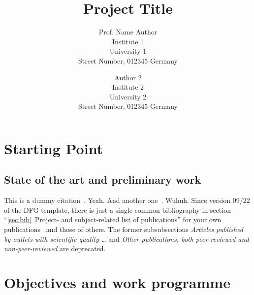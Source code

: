 \documentclass[american,firsttime]{dfgproposal}
\title{Project Title}
\author[%
	Prof. Name Author\\
	Institute 1, University 1 (Abbr)
	\and
	Author 2\\
	Institute 2, University 2 (Abbr2)
]{Prof. Name Author\\
	Institute 1\\University 1\\Street Number, 012345 Germany
	\and
	Author 2\\
	Institute 2\\University 2\\Street Number, 012345 Germany
}
\newcommand{\note}[1]{{\color{orange}{#1}}}
\begin{document}
	\maketitle
	
	\note{Sections 1--3 must not exceed 17 pages in total.}
	
	\section{Starting Point}
	\label{sec:work-report}
	
	\subsection{State of the art and preliminary work}
	This is a dummy citation~\cite{Hoelzer:17}. Yeah. And another
	one~\cite{Gerst:18}. Wuhuh.
	Since version 09/22 of the DFG template, there is just a single common
	bibliography in section \enquote{\ref{sec:bib}~Project- and subject-related
	list of publications} for your own publications~\cite{Hoelzer:16, Desiro:18}
	and those of others. The former subsubsections \emph{Articles published by
	outlets with scientific quality \dots} and \emph{Other publications, both
	peer-reviewed and non-peer-reviewed} are deprecated.
	
	\blindtext[1]
	
	
	\section{Objectives and work programme}
	
\end{document}

